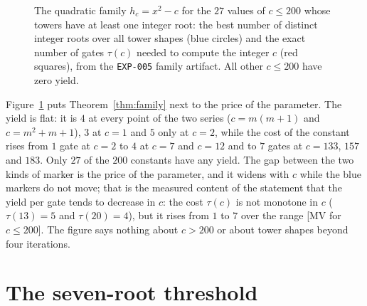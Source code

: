 \documentclass[11pt]{article}
\theoremstyle{definition}
\theoremstyle{remark}
\begin{document}
\begin{figure}[t]
\centering
{}
\caption{The quadratic family $h_c = x^2 - c$ for the $27$ values of $c \le 200$ whose towers have
at least one integer root: the best number of distinct integer roots over all tower shapes (blue
circles) and the exact number of gates $\tau(c)$ needed to compute the integer $c$ (red squares),
from the \texttt{EXP-005} family artifact. All other $c \le 200$ have zero yield.}
\label{fig:family}
\end{figure}

Figure~\ref{fig:family} puts Theorem~\ref{thm:family} next to the price of the parameter. The
yield is flat: it is $4$ at every point of the two series ($c = m(m+1)$ and $c = m^2+m+1$),
$3$ at $c = 1$ and $5$ only at $c = 2$, while the cost of the constant rises from $1$ gate at
$c = 2$ to $4$ at $c = 7$ and $c = 12$ and to $7$ gates at $c = 133$, $157$ and $183$. Only $27$ of
the $200$ constants have any yield. The gap between the two kinds of marker is the price of
the parameter, and it widens with $c$ while the blue markers do not move; that is the measured
content of the statement that the yield per gate tends to decrease in $c$: the cost $\tau(c)$ is not monotone in $c$ ($\tau(13) = 5$ and $\tau(20) = 4$), but it rises from $1$ to $7$ over the range [MV for $c \le 200$]. The
figure says nothing about $c > 200$ or about tower shapes beyond four iterations.

\section{The seven-root threshold}\label{sec:seven}
\end{document}

